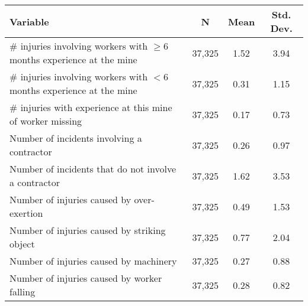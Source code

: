 \begin{tabular}{lccc}
\hline
Variable & N     & Mean  & Std. Dev. \bigstrut\\
\hline
$\#$ injuries involving workers with $\geq 6$ months experience at the mine &        37,325  & 1.52  & 3.94 \bigstrut[t]\\
$\#$ injuries involving workers with $< 6$ months experience at the mine &        37,325  & 0.31  & 1.15 \\
$\#$ injuries with experience at this mine of worker missing &        37,325  & 0.17  & 0.73 \\
Number of incidents involving a contractor &        37,325  & 0.26  & 0.97 \\
Number of incidents that do not involve a contractor &        37,325  & 1.62  & 3.53 \\
Number of injuries caused by over-exertion &        37,325  & 0.49  & 1.53 \\
Number of injuries caused by striking object &        37,325  & 0.77  & 2.04 \\
Number of injuries caused by machinery &        37,325  & 0.27  & 0.88 \\
Number of injuries caused by worker falling &        37,325  & 0.28  & 0.82 \bigstrut[b]\\
\hline
\end{tabular}%